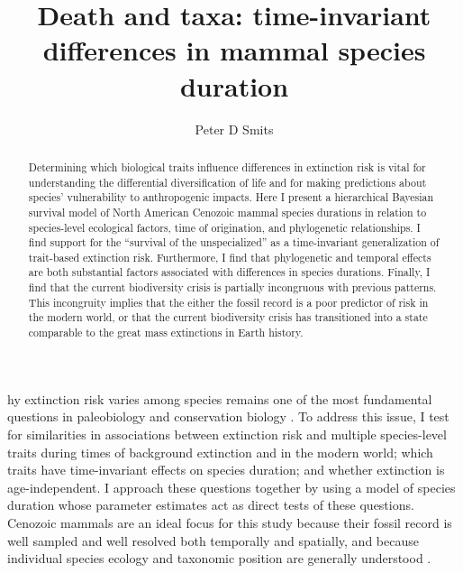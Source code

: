 \documentclass{pnastwo}
\begin{document}
\title{Death and taxa: time-invariant differences in mammal species duration}

\author{Peter D Smits}


\significancetext{}

\maketitle

\begin{article}
\begin{abstract}
 Determining which biological traits influence differences in extinction risk is vital for understanding the differential diversification of life and for making predictions about species' vulnerability to anthropogenic impacts. Here I present a hierarchical Bayesian survival model of North American Cenozoic mammal species durations in relation to species-level ecological factors, time of origination, and phylogenetic relationships. I find support for the ``survival of the unspecialized'' as a time-invariant generalization of trait-based extinction risk. Furthermore, I find that phylogenetic and temporal effects are both substantial factors associated with differences in species durations. Finally, I find that the current biodiversity crisis is partially incongruous with previous patterns. This incongruity implies that the either the fossil record is a poor predictor of risk in the modern world, or that the current biodiversity crisis has transitioned into a state comparable to the great mass extinctions in Earth history.
\end{abstract}



hy extinction risk varies among species remains one of the most fundamental questions in paleobiology and conservation biology \cite{Simpson1944,VanValen1973,Raup1994,Quental2013,Wagner2014b}. To address this issue, I test for similarities in associations between extinction risk and multiple species-level traits during times of background extinction and in the modern world; which traits have time-invariant effects on species duration; and whether extinction is age-independent. I approach these questions together by using a model of species duration whose parameter estimates act as direct tests of these questions. Cenozoic mammals are an ideal focus for this study because their fossil record is well sampled and well resolved both temporally and spatially, and because individual species ecology and taxonomic position are generally understood \cite{Simpson1944,Quental2013,Alroy2009,Liow2008,Smith2004,Tomiya2013,Marcot2014}. 


\end{article}
\end{document}
